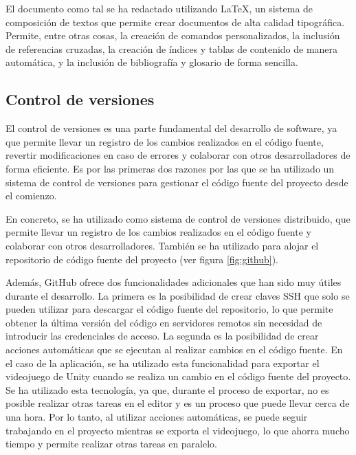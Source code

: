 El documento como tal se ha redactado utilizando \LaTeX, un sistema de
composición de textos que permite crear documentos de alta calidad tipográfica.
Permite, entre otras cosas, la creación de comandos personalizados, la inclusión
de referencias cruzadas, la creación de índices y tablas de contenido de manera
automática, y la inclusión de bibliografía y glosario de forma sencilla.

\subsection{Control de versiones}
\label{sec:control-versiones}
El control de versiones es una parte fundamental del desarrollo de software, ya
que permite llevar un registro de los cambios realizados en el código fuente,
revertir modificaciones en caso de errores y colaborar con otros desarrolladores
de forma eficiente. Es por las primeras dos razones por las que se ha utilizado
un sistema de control de versiones para gestionar el código fuente del proyecto
desde el comienzo.

En concreto, se ha utilizado  como sistema de
control de versiones distribuido, que permite llevar un registro de los cambios
realizados en el código fuente y colaborar con otros desarrolladores. También se
ha utilizado  para alojar el repositorio de
código fuente del proyecto (ver figura \ref{fig:github}).


Además, GitHub ofrece dos funcionalidades adicionales que han sido muy útiles
durante el desarrollo.  La primera es la posibilidad de crear claves SSH que
solo se pueden utilizar para descargar el código fuente del repositorio, lo que
permite obtener la última versión del código en servidores remotos sin necesidad
de introducir las credenciales de acceso. La segunda es la posibilidad de crear
acciones automáticas que se ejecutan al realizar cambios en el código fuente. En
el caso de la aplicación, se ha utilizado esta funcionalidad para exportar el
videojuego de Unity cuando se realiza un cambio en el código fuente del
proyecto. Se ha utilizado esta tecnología, ya que, durante el proceso de
exportar, no es posible realizar otras tareas en el editor y es un proceso que
puede llevar cerca de una hora. Por lo tanto, al utilizar acciones automáticas,
se puede seguir trabajando en el proyecto mientras se exporta el videojuego, lo
que ahorra mucho tiempo y permite realizar otras tareas en paralelo.

